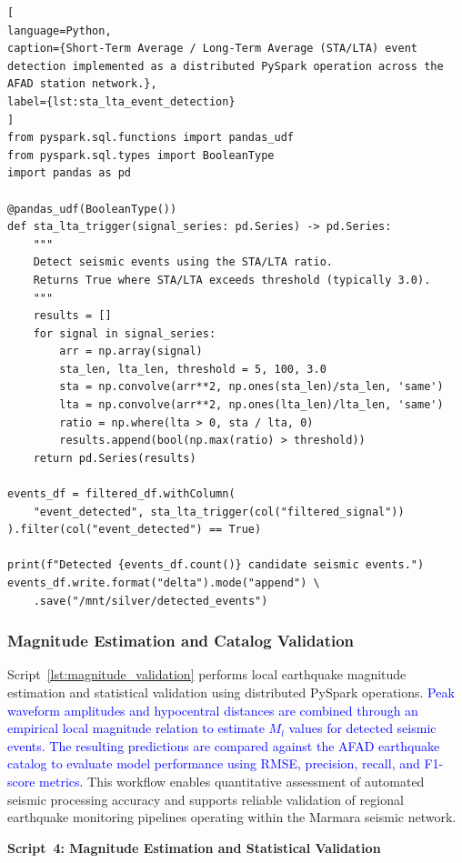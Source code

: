 \documentclass[data,article,submit,pdftex,moreauthors]{Definitions/mdpi}
\begin{document}
\begin{lstlisting}[
language=Python,
caption={Short-Term Average / Long-Term Average (STA/LTA) event detection implemented as a distributed PySpark operation across the AFAD station network.},
label={lst:sta_lta_event_detection}
]
from pyspark.sql.functions import pandas_udf
from pyspark.sql.types import BooleanType
import pandas as pd

@pandas_udf(BooleanType())
def sta_lta_trigger(signal_series: pd.Series) -> pd.Series:
    """
    Detect seismic events using the STA/LTA ratio.
    Returns True where STA/LTA exceeds threshold (typically 3.0).
    """
    results = []
    for signal in signal_series:
        arr = np.array(signal)
        sta_len, lta_len, threshold = 5, 100, 3.0
        sta = np.convolve(arr**2, np.ones(sta_len)/sta_len, 'same')
        lta = np.convolve(arr**2, np.ones(lta_len)/lta_len, 'same')
        ratio = np.where(lta > 0, sta / lta, 0)
        results.append(bool(np.max(ratio) > threshold))
    return pd.Series(results)

events_df = filtered_df.withColumn(
    "event_detected", sta_lta_trigger(col("filtered_signal"))
).filter(col("event_detected") == True)

print(f"Detected {events_df.count()} candidate seismic events.")
events_df.write.format("delta").mode("append") \
    .save("/mnt/silver/detected_events")
\end{lstlisting}

\subsubsection{Magnitude Estimation and Catalog Validation}

Script~\ref{lst:magnitude_validation} performs local earthquake magnitude estimation and statistical validation using distributed PySpark operations. \textcolor{blue}{Peak waveform amplitudes and hypocentral distances are combined through an empirical local magnitude relation to estimate $M_l$ values for detected seismic events. The resulting predictions are compared against the AFAD earthquake catalog to evaluate model performance using RMSE, precision, recall, and F1-score metrics}. This workflow enables quantitative assessment of automated seismic processing accuracy and supports reliable validation of regional earthquake monitoring pipelines operating within the Marmara seismic network.

\textbf{Script~4: Magnitude Estimation and Statistical Validation}
\end{document}
